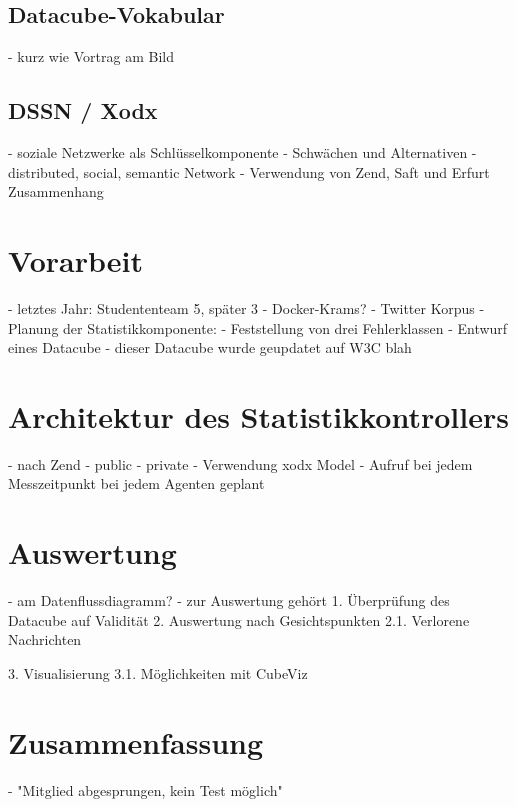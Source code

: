\documentclass{article}
\begin{document}
\subsection{Datacube-Vokabular}

- kurz wie Vortrag am Bild

\subsection{DSSN / Xodx}

- soziale Netzwerke als Schlüsselkomponente
- Schwächen und Alternativen
- distributed, social, semantic Network
- Verwendung von Zend, Saft und Erfurt Zusammenhang

\section{Vorarbeit}

- letztes Jahr: Studententeam 5, später 3
- Docker-Krams?
- Twitter Korpus
- Planung der Statistikkomponente:
	- Feststellung von drei Fehlerklassen
	- Entwurf eines Datacube
- dieser Datacube wurde geupdatet auf W3C blah


\section{Architektur des Statistikkontrollers}

- nach Zend
- public
- private
- Verwendung xodx Model
- Aufruf bei jedem Messzeitpunkt bei jedem Agenten geplant

\section{Auswertung}

- am Datenflussdiagramm?
- zur Auswertung gehört 
1. Überprüfung des Datacube auf Validität
2. Auswertung nach Gesichtspunkten
2.1. Verlorene Nachrichten

3. Visualisierung
3.1. Möglichkeiten mit CubeViz

\section{Zusammenfassung}

- "Mitglied abgesprungen, kein Test möglich"



\end{document}
